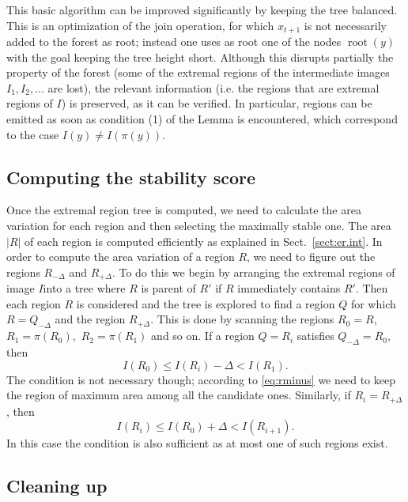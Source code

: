 \documentclass{article}
\newcommand{\rt}{\operatorname{root}}
\begin{document}
This basic algorithm can be improved significantly by keeping the tree balanced. This is an optimization of the join operation, for which $x_{t+1}$ is not necessarily added to the forest as root; instead one uses as root one of the nodes $\rt(y)$ with the goal keeping the tree height short. Although this disrupts partially the property of the forest (some of the extremal regions of the intermediate images $I_1, I_2, \ldots$ are lost), the relevant information (i.e. the regions that are extremal regions of $I$) is preserved, as it can be verified. In particular, regions can be emitted as soon as condition (1) of the Lemma is encountered, which correspond to the case $I(y) \not= I(\pi(y))$.

\subsection{Computing the stability score}

Once the extremal region tree is computed, we need to calculate the area variation for each region and then selecting the maximally stable one.
The area $|R|$ of each region is computed efficiently as explained in Sect.~\ref{sect:er.int}. In order to compute the area variation of a region $R$, we need to figure out the regions $R_{-\Delta}$ and $R_{+\Delta}$. 
To do this we begin by arranging the extremal regions of image $I$into a tree where $R$ is parent of $R'$ if $R$ immediately contains $R'$. Then each region $R$ is considered and the tree is explored to find a region $Q$ for which $R=Q_{-\Delta}$ and the region $R_{+\Delta}$. This is done by scanning the regions $R_0=R$, $R_1=\pi(R_0),$ $R_2=\pi(R_1)$ and so on. If a region $Q=R_i$ satisfies $Q_{-\Delta}=R_0$, then
\[
   I(R_0) \leq I(R_i) - \Delta < I(R_1).
\]
The condition is not necessary though; according to \eqref{eq:rminus} we need to keep the region of maximum area among all the candidate ones.
Similarly, if $R_i=R_{+\Delta}$, then
\[
   I(R_i) \leq I(R_0) + \Delta < I(R_{i+1}).
\]
In this case the condition is also sufficient as at most one of such regions exist.

\subsection{Cleaning up}\label{sect:er.cleanup}
\end{document}
